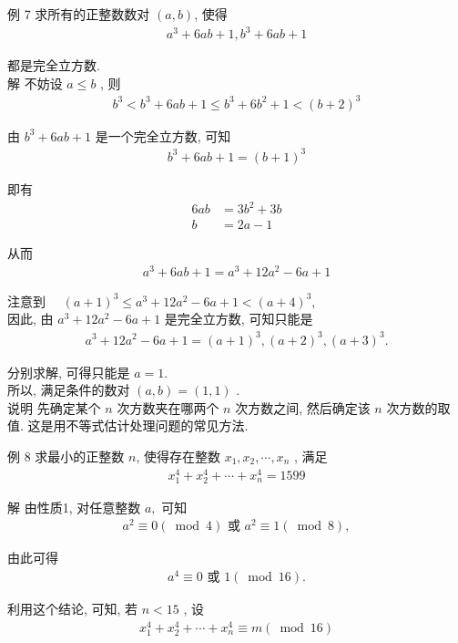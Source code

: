 例 7 求所有的正整数数对 $(a, b)$, 使得
\begin{align*}
	a^{3}+6 a b+1, b^{3}+6 a b+1
\end{align*}

都是完全立方数.\\
解 不妨设 $a \leqslant b$ , 则
\begin{align*}
	b^{3}<b^{3}+6 a b+1 \leqslant b^{3}+6 b^{2}+1<(b+2)^{3}
\end{align*}

由 $b^{3}+6 a b+1$ 是一个完全立方数, 可知
\begin{align*}
	b^{3}+6 a b+1=(b+1)^{3}
\end{align*}

即有\begin{align}
	6 a b & =3 b^{2}+3 b \\
	b     & =2 a-1
\end{align}

从而
\begin{align*}
	a^{3}+6 a b+1=a^{3}+12 a^{2}-6 a+1
\end{align*}

注意到 $\quad(a+1)^{3} \leqslant a^{3}+12 a^{2}-6 a+1<(a+4)^{3} , $\\
因此, 由 $a^{3}+12 a^{2}-6 a+1$ 是完全立方数, 可知只能是
\begin{align*}
	a^{3}+12 a^{2}-6 a+1=(a+1)^{3},(a+2)^{3},(a+3)^{3} .
\end{align*}

分别求解, 可得只能是 $a=1$.\\
所以, 满足条件的数对 $(a, b)=(1,1)$ . \\
说明 先确定某个 $n$ 次方数夹在哪两个 $n$ 次方数之间, 然后确定该 $n$ 次方数的取值. 这是用不等式估计处理问题的常见方法.

例 8 求最小的正整数 $n$, 使得存在整数 $x_{1}, x_{2}, \cdots, x_{n}$ , 满足
\begin{align*}
	x_{1}^{4}+x_{2}^{4}+\cdots+x_{n}^{4}=1599
\end{align*}

解 由性质1, 对任意整数 $a , $ 可知
\begin{align*}
	a^{2} \equiv 0(\bmod 4) \text { 或 } a^{2} \equiv 1(\bmod 8),
\end{align*}

由此可得
\begin{align*}
	a^{4} \equiv 0 \text { 或 } 1(\bmod 16) .
\end{align*}

利用这个结论, 可知, 若 $n<15$ , 设
\begin{align*}
	x_{1}^{4}+x_{2}^{4}+\cdots+x_{n}^{4} \equiv m(\bmod 16)
\end{align*}

